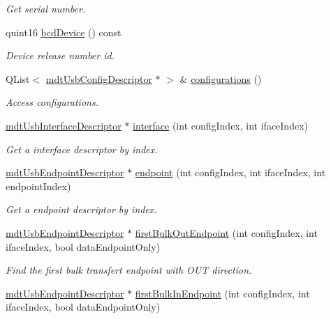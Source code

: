\begin{DoxyCompactItemize}
\begin{DoxyCompactList}\small\item\em Get serial number. \end{DoxyCompactList}\item 
quint16 \hyperlink{classmdt_usb_device_descriptor_a6b6f21f8dfdb707bfc23d01076b7ec5e}{bcdDevice} () const 
\begin{DoxyCompactList}\small\item\em Device release number id. \end{DoxyCompactList}\item 
QList$<$ \hyperlink{classmdt_usb_config_descriptor}{mdtUsbConfigDescriptor} $\ast$ $>$ \& \hyperlink{classmdt_usb_device_descriptor_acfc9e29a48b251012cbc38d339dc6a02}{configurations} ()
\begin{DoxyCompactList}\small\item\em Access configurations. \end{DoxyCompactList}\item 
\hyperlink{classmdt_usb_interface_descriptor}{mdtUsbInterfaceDescriptor} $\ast$ \hyperlink{classmdt_usb_device_descriptor_af1e27ae69d3c77c9dfc53a3f261caeae}{interface} (int configIndex, int ifaceIndex)
\begin{DoxyCompactList}\small\item\em Get a interface descriptor by index. \end{DoxyCompactList}\item 
\hyperlink{classmdt_usb_endpoint_descriptor}{mdtUsbEndpointDescriptor} $\ast$ \hyperlink{classmdt_usb_device_descriptor_a41582e524cba87f52ca3628c0b690b8d}{endpoint} (int configIndex, int ifaceIndex, int endpointIndex)
\begin{DoxyCompactList}\small\item\em Get a endpoint descriptor by index. \end{DoxyCompactList}\item 
\hyperlink{classmdt_usb_endpoint_descriptor}{mdtUsbEndpointDescriptor} $\ast$ \hyperlink{classmdt_usb_device_descriptor_ac1991e3d800700b2c099cd1aca2274d1}{firstBulkOutEndpoint} (int configIndex, int ifaceIndex, bool dataEndpointOnly)
\begin{DoxyCompactList}\small\item\em Find the first bulk transfert endpoint with OUT direction. \end{DoxyCompactList}\item 
\hyperlink{classmdt_usb_endpoint_descriptor}{mdtUsbEndpointDescriptor} $\ast$ \hyperlink{classmdt_usb_device_descriptor_a078b5d3dfe6fd56ab2f716357a160585}{firstBulkInEndpoint} (int configIndex, int ifaceIndex, bool dataEndpointOnly)

\end{DoxyCompactItemize}
